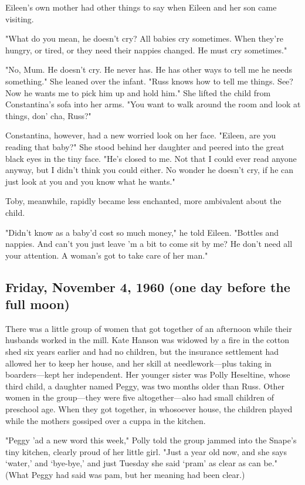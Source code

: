 Eileen's own mother had other things to say when Eileen and her son came visiting.

"What do you mean, he doesn't cry? All babies cry sometimes. When they're hungry, or tired, or they need their nappies changed. He must cry sometimes."

"No, Mum. He doesn't cry. He never has. He has other ways to tell me he needs something." She leaned over the infant. "Russ knows how to tell me things. See? Now he wants me to pick him up and hold him." She lifted the child from Constantina's sofa into her arms. "You want to walk around the room and look at things, don' cha, Russ?"

Constantina, however, had a new worried look on her face. "Eileen, are you reading that baby?" She stood behind her daughter and peered into the great black eyes in the tiny face. "He's closed to me. Not that I could ever read anyone anyway, but I didn't think you could either. No wonder he doesn't cry, if he can just look at you and you know what he wants."

Toby, meanwhile, rapidly became less enchanted, more ambivalent about the child.

"Didn't know as a baby'd cost so much money," he told Eileen. "Bottles and nappies. And can't you just leave 'm a bit to come sit by me? He don't need all your attention. A woman's got to take care of her man."

\subsection{Friday, November 4, 1960 (one day before the full moon)}

There was a little group of women that got together of an afternoon while their husbands worked in the mill. Kate Hanson was widowed by a fire in the cotton shed six years earlier and had no children, but the insurance settlement had allowed her to keep her house, and her skill at needlework—plus taking in boarders—kept her independent. Her younger sister was Polly Heseltine, whose third child, a daughter named Peggy, was two months older than Russ. Other women in the group—they were five altogether—also had small children of preschool age. When they got together, in whosoever house, the children played while the mothers gossiped over a cuppa in the kitchen.

"Peggy 'ad a new word this week," Polly told the group jammed into the Snape's tiny kitchen, clearly proud of her little girl. "Just a year old now, and she says `water,' and `bye-bye,' and just Tuesday she said `pram' as clear as can be." (What Peggy had said was pam, but her meaning had been clear.)

